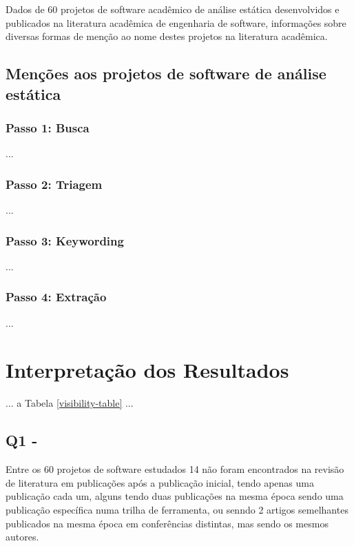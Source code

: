 Dados de 60 projetos de software acadêmico de análise estática desenvolvidos e
publicados na literatura acadêmica de engenharia de software, informações sobre
diversas formas de menção ao nome destes projetos na literatura acadêmica.

\subsection{Menções aos projetos de software de análise estática}

\subsubsection{Passo 1: Busca}

...

\subsubsection{Passo 2: Triagem}

...

\subsubsection{Passo 3: Keywording}

...

\subsubsection{Passo 4: Extração}

...

\section{Interpretação dos Resultados} %

... a Tabela \ref{visibility-table} ...

%

\subsection{Q1 - \EstudoDoisQuestaoUm}



Entre os 60 projetos de software estudados 14 não foram encontrados na revisão
de literatura em publicações após a publicação inicial, tendo apenas uma
publicação cada um, alguns tendo duas publicações na mesma época sendo uma
publicação específica numa trilha de ferramenta, ou senndo 2 artigos
semelhantes publicados na mesma época em conferências distintas, mas sendo os
mesmos autores.

